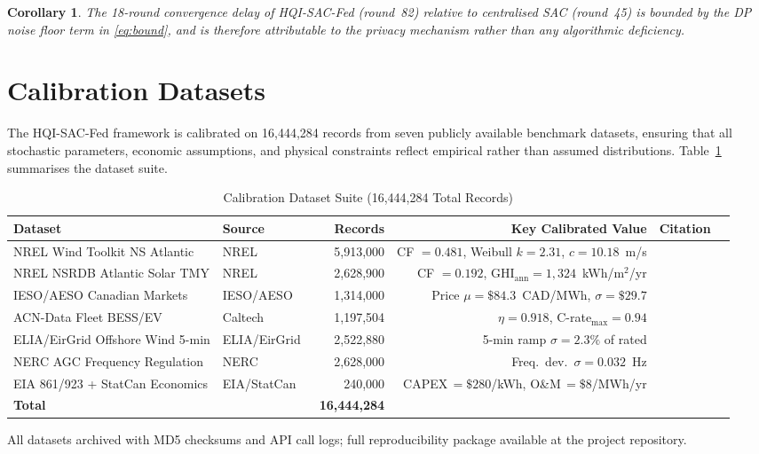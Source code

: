 \documentclass[journal]{IEEEtran}
\newtheorem{corollary}{Corollary}[theorem]
\begin{document}
\begin{corollary}
The 18-round convergence delay of HQI-SAC-Fed (round~82) relative to
centralised SAC (round~45) is bounded by the DP noise floor term in
\eqref{eq:bound}, and is therefore attributable to the privacy
mechanism rather than any algorithmic deficiency.
\end{corollary}

\section{Calibration Datasets}

The HQI-SAC-Fed framework is calibrated on 16,444,284 records from
seven publicly available benchmark datasets, ensuring that all
stochastic parameters, economic assumptions, and physical constraints
reflect empirical rather than assumed distributions.
Table~\ref{tab:datasets} summarises the dataset suite.

\begin{table}[t]
\caption{Calibration Dataset Suite (16,444,284 Total Records)}
\label{tab:datasets}
\centering
\small
\begin{tabular}{llrrll}
\toprule
\textbf{Dataset} & \textbf{Source} & \textbf{Records} &
\textbf{Key Calibrated Value} & \textbf{Citation} \\
\midrule
NREL Wind Toolkit NS Atlantic  & NREL~\cite{draxl2015wind}
  & 5,913,000  & CF $= 0.481$, Weibull $k{=}2.31$, $c{=}10.18$~m/s & \\
NREL NSRDB Atlantic Solar TMY  & NREL~\cite{sengupta2018nsrdb}
  & 2,628,900  & CF $= 0.192$, GHI$_{\mathrm{ann}} = 1{,}324$~kWh/m$^2$/yr & \\
IESO/AESO Canadian Markets     & IESO/AESO~\cite{ieso2024,aeso2024}
  & 1,314,000  & Price $\mu{=}\$84.3$~CAD/MWh, $\sigma{=}\$29.7$ & \\
ACN-Data Fleet BESS/EV         & Caltech~\cite{lee2019acn}
  & 1,197,504  & $\eta = 0.918$, C-rate$_{\max} = 0.94$ & \\
ELIA/EirGrid Offshore Wind 5-min & ELIA/EirGrid~\cite{elia2024,eirgrid2024}
  & 2,522,880  & 5-min ramp $\sigma{=}2.3\%$ of rated & \\
NERC AGC Frequency Regulation  & NERC~\cite{nerc2024}
  & 2,628,000  & Freq.\ dev.\ $\sigma{=}0.032$~Hz & \\
EIA 861/923 + StatCan Economics & EIA/StatCan~\cite{eia2024,statcan2024}
  & 240,000    & CAPEX\,$=\$280$/kWh, O\&M\,$=\$8$/MWh/yr & \\
\midrule
\textbf{Total} & & \textbf{16,444,284} & & \\
\bottomrule
\end{tabular}
\begin{flushleft}
\footnotesize All datasets archived with MD5 checksums and API call
logs; full reproducibility package available at the project
repository.\vspace{-4pt}
\end{flushleft}
\end{table}
\end{document}
